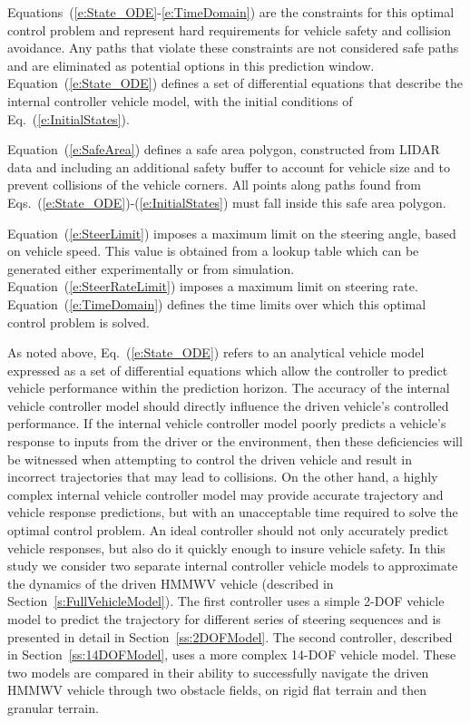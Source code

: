 \documentclass[12pt,onecolumn]{report}
\newcommand{\CHRONO}{{\sffamily{{Chrono}}}}
\begin{document}
Equations~(\ref{e:State_ODE}-\ref{e:TimeDomain}) are the constraints for this optimal control problem and represent hard requirements for vehicle safety and collision avoidance. Any paths that violate these constraints are not considered safe paths and are eliminated as potential options in this prediction window. Equation~(\ref{e:State_ODE}) defines a set of differential equations that describe the internal controller vehicle model, with the initial conditions of Eq.~(\ref{e:InitialStates}).

Equation~(\ref{e:SafeArea}) defines a safe area polygon, constructed from LIDAR data and including an additional safety buffer to account for vehicle size and to prevent collisions of the vehicle corners.  All points along paths found from Eqs.~(\ref{e:State_ODE})-(\ref{e:InitialStates}) must fall inside this safe area polygon.

Equation~(\ref{e:SteerLimit}) imposes a maximum limit on the steering angle, based on vehicle speed. This value is obtained from a lookup table which can be generated either experimentally or from simulation. Equation~(\ref{e:SteerRateLimit}) imposes a maximum limit on steering rate. Equation~(\ref{e:TimeDomain}) defines the time limits over which this optimal control problem is solved.

As noted above, Eq.~(\ref{e:State_ODE}) refers to an analytical vehicle model expressed as a set of differential equations which allow the controller to predict vehicle performance within the prediction horizon. The accuracy of the internal vehicle controller model should directly influence the driven vehicle's controlled performance. If the internal vehicle controller model poorly predicts a vehicle's response to inputs from the driver or the environment, then these deficiencies will be witnessed when attempting to control the driven vehicle and result in incorrect trajectories that may lead to collisions. On the other hand, a highly complex internal vehicle controller model may provide accurate trajectory and vehicle response predictions, but with an unacceptable time required to solve the optimal control problem. An ideal controller should not only accurately predict vehicle responses, but also do it quickly enough to insure vehicle safety. 
In this study we consider two separate internal controller vehicle models to approximate the dynamics of the driven {\CHRONO} HMMWV vehicle (described in Section~\ref{s:FullVehicleModel}).  The first controller uses a simple 2-DOF vehicle model to predict the trajectory for different series of steering sequences and is presented in detail in Section~\ref{ss:2DOFModel}. The second controller, described in Section~\ref{ss:14DOFModel}, uses a more complex 14-DOF vehicle model. These two models are compared in their ability to successfully navigate the driven HMMWV vehicle through two obstacle fields, on rigid flat terrain and then granular terrain.
\end{document}
